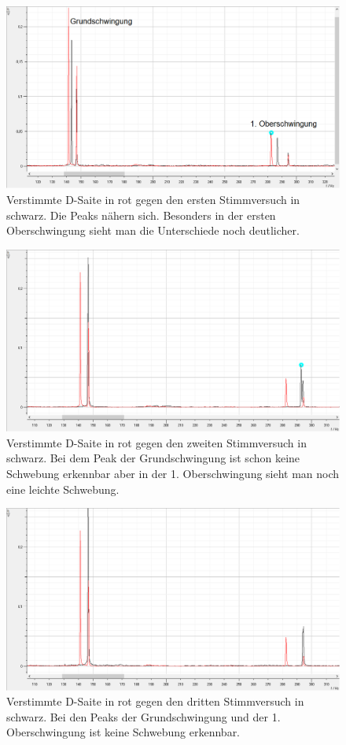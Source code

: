 \documentclass[12pt,a4paper]{article}
\begin{document}
\begin{figure}[H]
\centering
\includegraphics[scale=0.5]{Bilder/Verstimmt_vs_1_stimmen.png}
\caption{Verstimmte D-Saite in rot gegen den ersten Stimmversuch in schwarz. Die Peaks nähern sich. Besonders in der ersten Oberschwingung sieht man die Unterschiede noch deutlicher.}
\end{figure}

\begin{figure}[H]
\centering
\includegraphics[scale=0.5]{Bilder/Verstimmt_vs_2_stimmen.png}
\caption{Verstimmte D-Saite in rot gegen den zweiten Stimmversuch in schwarz. Bei dem Peak der Grundschwingung ist schon keine Schwebung erkennbar aber in der 1. Oberschwingung sieht man noch eine leichte Schwebung.}
\end{figure}

\begin{figure}[H]
\centering
\includegraphics[scale=0.5]{Bilder/Verstimmt_vs_3_stimmen.png}
\caption{Verstimmte D-Saite in rot gegen den dritten Stimmversuch in schwarz. Bei den Peaks der Grundschwingung und der 1. Oberschwingung ist keine Schwebung erkennbar.}
\end{figure}
\end{document}
